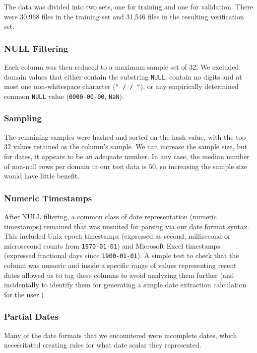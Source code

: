 The data was divided into two sets, one for training and one for validation. There were 30,968 files in the training set and 31,546 files in the resulting verification set.


\subsubsection{NULL Filtering}
Each column was then reduced to a maximum sample set of 32. We excluded domain values that either contain the substring \texttt{NULL}, contain no digits and at most one non-whitespace character (\eg \texttt{" / / "}), or any empirically determined common \texttt{NULL} value (\eg \texttt{0000-00-00}, \texttt{NaN}).

\subsubsection{Sampling}
The remaining samples were hashed and sorted on the hash value, with the top $32$ values retained as the column's sample. We can increase the sample size, but for dates, it appears to be an adequate number. In any case, the median number of non-null rows per domain in our test data is $50$, so increasing the sample size would have little benefit.

\subsubsection{Numeric Timestamps}
After NULL filtering, a common class of date representation (numeric timestamps) remained that was unsuited for parsing via our date format syntax. This included Unix epoch timestamps (expressed as second, millisecond or microsecond counts from \texttt{1970-01-01}) and Microsoft Excel timestamps (expressed fractional days since \texttt{1900-01-01}). A simple test to check that the column was numeric and inside a specific range of values representing recent dates allowed us to tag these columns to avoid analyzing them further (and incidentally to identify them for generating a simple date extraction calculation for the user.)


\subsubsection{Partial Dates}
Many of the date formats that we encountered were incomplete dates, which necessitated creating rules for what date scalar they represented.

